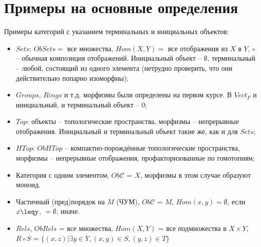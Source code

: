 \documentclass[a4paper]{article}
\theoremstyle{indented}
\theoremstyle{definition}
\theoremstyle{remark}
\begin{document}
\section{Примеры на основные определения}
Примеры категорий с указанием терминальных и инициальных объектов: \begin{itemize}
\item $Sets$: $ObSets=$ все множества, $Hom(X, Y)=$ все отображения из $X$ в $Y$, $\circ$ -- обычная композиция отображений. Инициальный объект -- $\emptyset$, терминальный -- любой, состоящий из одного элемента (нетрудно проверить, что они действительно попарно изоморфны);
\item $Groups$, $Rings$ и т.д. морфизмы были определены на первом курсе. В $Vect_{F}$ и инициальный, и терминальный объект -- 0;
\item $Top$: объекты -- топологические пространства, морфизмы -- непрерывные отображения. Инициальный и терминальный объект такие же, как и для $Sets$;
\item $HTop$: $ObHTop$ -- компактно-порождённые топологические пространства, морфизмы -- непрерывные отображения, профакторизованные по гомотопиям;
\item Категория с одним элементом, $Ob\mathcal{C}$ = ${X}$, морфизмы в этом случае образуют моноид.
\item Частичный (пред)порядок на $M$ (ЧУМ), $Ob\mathcal{C}$ = $M$, $Hom(x, y) = {\emptyset}$, если $x\leqy$, $=\emptyset$, иначе.
\item $Rels$, $ObRels$ = все множества, $Hom(X, Y)$ = все подмножества в $X\times{Y}$, 
\\$R\circ S$ = $\lbrace(x, z) \vert \exists y \in Y, (x, y)\in S, (y, z)\in T\rbrace$


\end{itemize}
\end{document}
